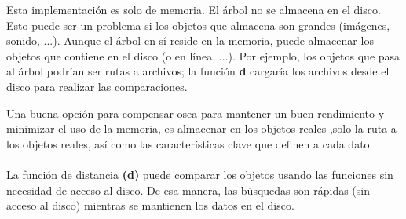 \documentclass[a4paper]{article}
\begin{document}
Esta implementación es solo de memoria. El árbol no se almacena en el disco. Esto puede ser un problema si los objetos que almacena son grandes (imágenes, sonido, ...). Aunque el árbol en sí reside en la memoria, puede almacenar los objetos que contiene en el disco (o en línea, ...). Por ejemplo, los objetos que pasa al árbol podrían ser rutas a archivos; la función \textbf{d} cargaría los archivos desde el disco para realizar las comparaciones.

Una buena opción para compensar osea  para mantener un buen rendimiento y minimizar el uso de la memoria,  es almacenar en los objetos reales  ,solo  la ruta  a los objetos  reales, así como las características clave que definen a cada dato. 
\\
\\
La función de distancia \textbf{(d)} puede comparar los objetos usando las funciones sin necesidad de acceso al disco. De esa manera, las búsquedas son rápidas (sin acceso al disco) mientras se mantienen los datos en el disco\cite{repositorio}.



\end{document}
